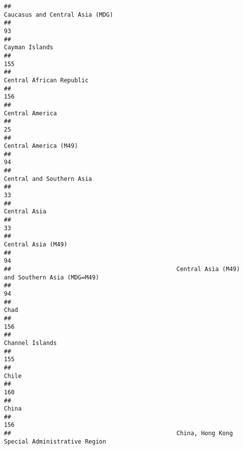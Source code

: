 \documentclass[]{article}
\begin{document}
\begin{verbatim}
##                                                              Caucasus and Central Asia (MDG) 
##                                                                                           93 
##                                                                               Cayman Islands 
##                                                                                          155 
##                                                                     Central African Republic 
##                                                                                          156 
##                                                                              Central America 
##                                                                                           25 
##                                                                        Central America (M49) 
##                                                                                           94 
##                                                                    Central and Southern Asia 
##                                                                                           33 
##                                                                                 Central Asia 
##                                                                                           33 
##                                                                           Central Asia (M49) 
##                                                                                           94 
##                                               Central Asia (M49) and Southern Asia (MDG=M49) 
##                                                                                           94 
##                                                                                         Chad 
##                                                                                          156 
##                                                                              Channel Islands 
##                                                                                          155 
##                                                                                        Chile 
##                                                                                          160 
##                                                                                        China 
##                                                                                          156 
##                                               China, Hong Kong Special Administrative Region 

\end{verbatim}
\end{document}
